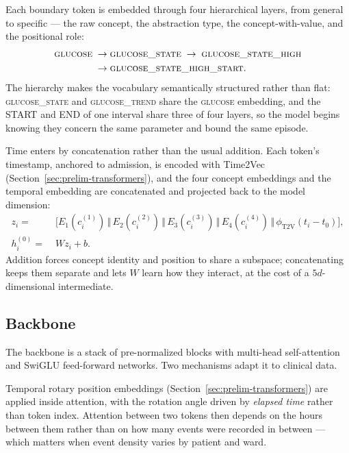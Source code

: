 Each boundary token is embedded through four hierarchical layers, from general to specific --- the raw concept, the abstraction type, the concept-with-value, and the positional role:
\[
\begin{aligned}
\textsc{glucose} \;\rightarrow\;& \textsc{glucose\_state} \;\rightarrow\; \textsc{glucose\_state\_high} \\
\rightarrow\;& \textsc{glucose\_state\_high\_start}.
\end{aligned}
\]
The hierarchy makes the vocabulary semantically structured rather than flat: \textsc{glucose\_state} and \textsc{glucose\_trend} share the \textsc{glucose} embedding, and the START and END of one interval share three of four layers, so the model begins knowing they concern the same parameter and bound the same episode.

Time enters by concatenation rather than the usual addition. Each token's timestamp, anchored to admission, is encoded with Time2Vec (Section~\ref{sec:prelim-transformers}), and the four concept embeddings and the temporal embedding are concatenated and projected back to the model dimension:
\begin{equation}
\begin{aligned}
z_i =\;&
\Big[
E_1(c_i^{(1)}) \,\Vert\,
E_2(c_i^{(2)}) \,\Vert\,
E_3(c_i^{(3)}) \,\Vert\,
E_4(c_i^{(4)}) \,\Vert\,
\phi_{\mathrm{T2V}}(t_i-t_0)
\Big],\\[2pt]
h_i^{(0)} =\;& W z_i + b .
\end{aligned}
\end{equation}
Addition forces concept identity and position to share a subspace; concatenating keeps them separate and lets $W$ learn how they interact, at the cost of a $5d$-dimensional intermediate.

\subsection{Backbone}

The backbone is a stack of pre-normalized blocks with multi-head self-attention and SwiGLU feed-forward networks. Two mechanisms adapt it to clinical data.

Temporal rotary position embeddings (Section~\ref{sec:prelim-transformers}) are applied inside attention, with the rotation angle driven by \emph{elapsed time} rather than token index. Attention between two tokens then depends on the hours between them rather than on how many events were recorded in between --- which matters when event density varies by patient and ward.

